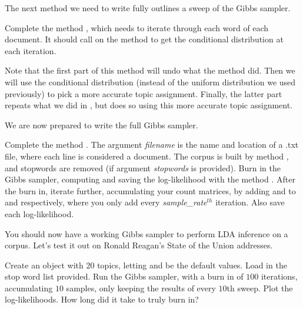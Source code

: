 The next method we need to write fully outlines a sweep of the Gibbs sampler.

\begin{problem}
Complete the method , which needs to iterate through each word of each document. It should call on the method  to get the conditional distribution at each iteration.

Note that the first part of this method will undo what the  method did.  Then we will use the conditional distribution (instead of the uniform distribution we used previously) to pick a more accurate topic assignment.  Finally, the latter part repeats what we did in , but does so using this more accurate topic assignment. 
\end{problem}

\begin{comment}
Take out this problem to make the lab easier.
We need to write the method to create the appropriate conditional distribution.

\begin{problem}
Complete the method \li{\_conditional}. It accepts arguments $m,w$ where $m$ is the document and $w$ is an index of \li{vocab}. Don't forget to normalize to ensure you are actually returning a distribution!
\end{problem}
\end{comment}
We are now prepared to write the full Gibbs sampler.

\begin{problem}
Complete the method . The argument \emph{filename} is the name and location of a .txt file, where each line is considered a document. The corpus is built by method , and stopwords are removed (if argument \emph{stopwords} is provided). Burn in the Gibbs sampler, computing and saving the log-likelihood with the method . After the burn in, iterate further, accumulating your count matrices, by adding  and  to  and  respectively, where you only add every \emph{sample\_rate}$^{th}$ iteration. Also save each log-likelihood.
\end{problem}

You should now have a working Gibbs sampler to perform LDA inference on a corpus. Let's test it out on Ronald Reagan's State of the Union addresses.

\begin{problem}
Create an  object with $20$ topics, letting  and  be the default values. Load in the stop word list provided. Run the Gibbs sampler, with a burn in of $100$ iterations, accumulating $10$ samples, only keeping the results of every $10$th sweep. Plot the log-likelihoods. How long did it take to truly burn in?
\end{problem}

